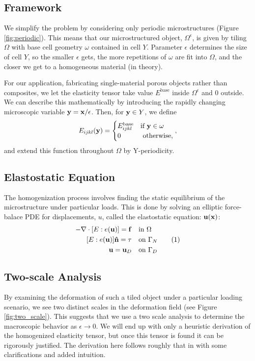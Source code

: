\documentclass[10pt]{article}
\providecommand{\e}{\epsilon}
\newcommand\numberthis{\addtocounter{equation}{1}\tag{\theequation}}
\begin{document}
\subsection{Framework}
We simplify the problem by considering only periodic microstructures (Figure
\ref{fig:periodic}). This means that our microstructured object, $\Omega^\e$,
is given by tiling $\Omega$ with base cell geometry $\omega$ contained in cell $Y$.
Parameter $\epsilon$ determines the size of cell $Y$, so the smaller $\epsilon$
gets, the more repetitions of $\omega$ are fit into $\Omega$, and the closer we
get to a homogeneous material (in theory).

For our application, fabricating single-material porous objects rather
than composites, we let the elasticity tensor take value $E^\text{base}$ inside
$\Omega^\e$ and $0$ outside. We can describe this mathematically by introducing
the rapidly changing microscopic variable ${\bf y} = {\bf x} / \epsilon$. Then,
for ${\bf y} \in Y$, we define
$$
E_{ijkl} ({\bf y}) = \begin{cases} E_{ijkl}^\text{base} & \text{if } {\bf y} \in \omega \\
                                 0 & \text{ otherwise,} \end{cases},
$$
and extend this function throughout $\Omega$ by Y-periodicity.

\subsection{Elastostatic Equation}
The homogenization process involves finding the static equilibrium of the
microstructure under particular loads. This is done by solving an
elliptic force-balace PDE for displacements, $u$, called the elastostatic
equation:
${\bf u}({\bf x})$:
\begin{align*}
    -\nabla \cdot [E : e({\bf u})] = {\bf f} \quad &\text{in } \Omega \\
    [E : e({\bf u})] {\bf \hat{n} \bf} = {\bf \tau} \quad &\text{on } \Gamma_N \numberthis \label{eqn:elastostatic} \\
    {\bf u} = {\bf u}_D \quad &\text{on } \Gamma_D
\end{align*}
 
\subsection{Two-scale Analysis}
By examining the deformation of such a tiled object under a particular loading
scenario, we see two distinct scales in the deformation field (see Figure
\ref{fig:two_scale}). This suggests that we use a two scale analysis to
determine the macroscopic behavior as $\e \to 0$. We will end up with only a
heuristic derivation of the homogenized elasticity tensor, but once this tensor
is found it can be rigorously justified. The derivation here follows roughly
that in \cite{allaire2002shape} with some clarifications and added intuition.
\end{document}
